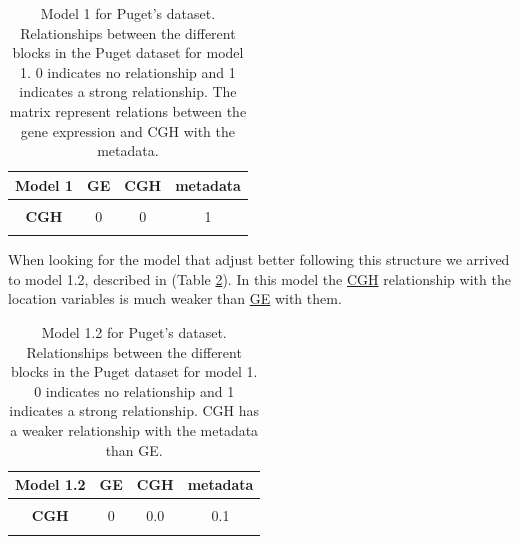 \documentclass[
  12pt,
  a4paper,
  twoside,
  openright]{book}
\begin{document}
\begin{table}[H]

\caption[Model 1 for the Puget's dataset.]{\label{tab:puget-model1}Model 1 for Puget's dataset. Relationships between the different blocks in the Puget dataset for model 1. 0 indicates no relationship and 1 indicates a strong relationship. The matrix represent relations between the gene expression and CGH with the metadata.}
\centering
\begin{tabular}[t]{>{}c|c|c|c}
\hline
\textbf{Model 1} & \textbf{GE} & \textbf{CGH} & \textbf{metadata}\\
\hline
\textbf{\cellcolor{gray!6}{GE}} & \cellcolor{gray!6}{0} & \cellcolor{gray!6}{0} & \cellcolor{gray!6}{1}\\
\hline
\textbf{CGH} & 0 & 0 & 1\\
\hline
\textbf{\cellcolor{gray!6}{metadata}} & \cellcolor{gray!6}{1} & \cellcolor{gray!6}{1} & \cellcolor{gray!6}{0}\\
\hline
\end{tabular}
\end{table}

When looking for the model that adjust better following this structure we arrived to model 1.2, described in (Table \ref{tab:puget-model1-2}).
In this model the \protect\hyperlink{acronyms_CGH}{CGH} relationship with the location variables is much weaker than \protect\hyperlink{acronyms_GE}{GE} with them.

\begin{table}[H]

\caption[Model 1.2 for the Puget's dataset.]{\label{tab:puget-model1-2}Model 1.2 for Puget's dataset. Relationships between the different blocks in the Puget dataset for model 1. 0 indicates no relationship and 1 indicates a strong relationship. CGH has a weaker relationship with the metadata than GE. }
\centering
\begin{tabular}[t]{>{}c|c|c|c}
\hline
\textbf{Model 1.2} & \textbf{GE} & \textbf{CGH} & \textbf{metadata}\\
\hline
\textbf{\cellcolor{gray!6}{GE}} & \cellcolor{gray!6}{0} & \cellcolor{gray!6}{0.0} & \cellcolor{gray!6}{1.0}\\
\hline
\textbf{CGH} & 0 & 0.0 & 0.1\\
\hline
\textbf{\cellcolor{gray!6}{metadata}} & \cellcolor{gray!6}{1} & \cellcolor{gray!6}{0.1} & \cellcolor{gray!6}{0.0}\\
\hline
\end{tabular}
\end{table}
\end{document}
